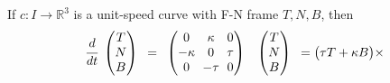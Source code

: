 \documentclass[10pt]{article}
\begin{document}
            \begin{theorem}
                If $c: I\rightarrow\mathbb{R}^3$ is a unit-speed curve with F-N frame $T, N, B$, then
                \begin{equation*}
                    \begin{aligned}
                        \cfrac{d}{dt}
                        \begin{array}{lc}
                            \setlength{\arraycolsep}{3pt}
                            \begingroup
                            \renewcommand*{\arraystretch}{1}
                            \begin{pmatrix}
                                T \\
                                N \\
                                B \\
                            \end{pmatrix}
                            \endgroup
                        \end{array} = 
                        \begin{array}{lc}
                            \setlength{\arraycolsep}{3pt}
                            \begingroup
                            \renewcommand*{\arraystretch}{1}
                            \begin{pmatrix}
                                0 & \kappa & 0 \\
                                -\kappa & 0 & \tau \\
                                0 & -\tau & 0 \\
                            \end{pmatrix}
                            \endgroup
                        \end{array}
                        \begin{array}{lc}
                            \setlength{\arraycolsep}{3pt}
                            \begingroup
                            \renewcommand*{\arraystretch}{1}
                            \begin{pmatrix}
                                T \\
                                N \\
                                B \\
                            \end{pmatrix}
                            \endgroup
                        \end{array} = \big(\tau T+\kappa B\big)\times

\end{aligned}
\end{equation*}
\end{theorem}
\end{document}
